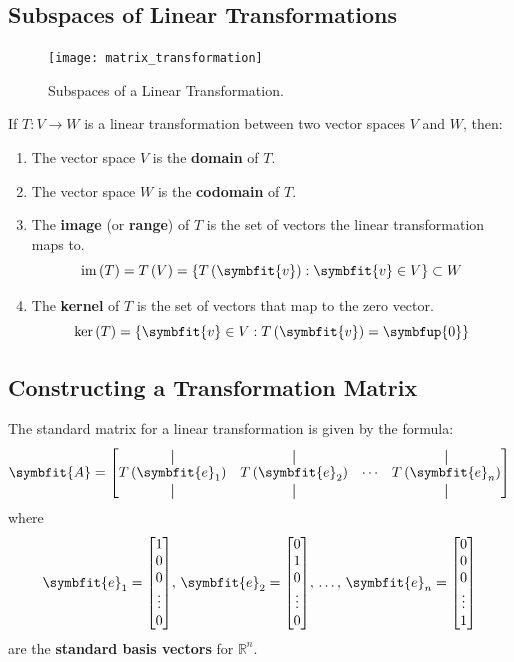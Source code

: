 \documentclass{article}
\begin{document}
	\subsection{Subspaces of Linear Transformations}
	\begin{figure}[H]
		\centering
		\texttt{[image: matrix\_transformation]}
		\caption{Subspaces of a Linear Transformation.}
	\end{figure}
	\begin{definition}
		If $T:V \rightarrow W$ is a linear transformation between two vector spaces $V$ and $W$, then:
		\begin{enumerate}
			\item The vector space $V$ is the \textbf{domain} of $T$.
			\item The vector space $W$ is the \textbf{codomain} of $T$.
			\item The \textbf{image} (or \textbf{range}) of $T$ is the set of vectors the linear transformation maps to.
			\begin{equation*}
				\vim{\left( T \right)} = T\left(V\right) = \left\{ T\left(\symbfit{v}\right) : \symbfit{v}\in V \right\} \subset W
			\end{equation*}
			\item The \textbf{kernel} of $T$ is the set of vectors that map to the zero vector.
			\begin{equation*}
				\vker{\left( T \right)} = \left\{ \symbfit{v}\in V : T\left(\symbfit{v}\right)=\symbfup{0} \right\}
			\end{equation*}
		\end{enumerate}
	\end{definition}
	\subsection{Constructing a Transformation Matrix}
	\begin{theorem}
		The standard matrix for a linear transformation is given by the formula:
		\begin{equation*}
			\symbfit{A} = \mqty[
				\vertbar & \vertbar & & \vertbar \\ 
				T\left(\symbfit{e}_1\right) & T\left(\symbfit{e}_2\right) & \cdots & T\left(\symbfit{e}_n\right) \\ 
				\vertbar & \vertbar & & \vertbar
			]
		\end{equation*}
		where
		\begin{equation*}
			\symbfit{e}_1 = \mqty[1 \\ 0 \\ 0 \\ \vdots \\ 0],\, \symbfit{e}_2 = \mqty[0 \\ 1 \\ 0 \\ \vdots \\ 0],\, \dots,\, \symbfit{e}_n = \mqty[0 \\ 0 \\ 0 \\ \vdots \\ 1]
		\end{equation*}
		are the \textbf{standard basis vectors} for $\mathbb{R}^n$.
	\end{theorem}
	\newpage
\end{document}
